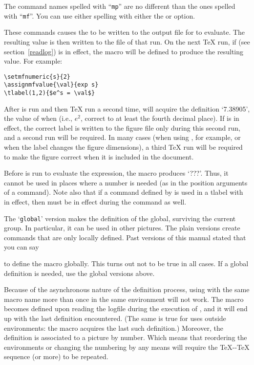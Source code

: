 \documentclass[letterpaper]{article}
\begin{document}
The command names spelled with ``\texttt{mp}'' are no different than the
ones spelled with ``\texttt{mf}''. You can use either spelling with
either the  or  option.

These commands causes the  to be written to the output
file for \MF{} to evaluate. The resulting value is then written to the
 file of that \MF{} run. On the next \TeX{} run, if
 (see section~\ref{readlog}) is in effect, the macro
 will be defined to produce the resulting value. For
example:
\begin{verbatim}
\setmfnumeric{s}{2}
\assignmfvalue{\val}{exp s}
\tlabel(1,2){$e^s = \val$}
\end{verbatim}
After \MF{} is run and then \TeX{} run a second time,  will
acquire the definition `7.38905', the value of  when
 (i.e., $e^2$, correct to at least the fourth decimal place).
If  is in effect, the correct label is written to the
figure file only during this second run, and a second \MP{} run will be
required. In many cases (when using \pdfTeX{}, for example, or when the
label changes the figure dimensions), a third \TeX{} run will be
required to make the figure correct when it is included in the document.

Before \MF{} is run to evaluate the expression, the macro produces
`???'. Thus, it cannot be used in places where a number is needed (as in
the position arguments of a  command). Note also that if a
command defined by  is used in a tlabel with
 in effect, then  must be in effect during
the  command as well.

The `\texttt{global}' version makes the definition of the
 global, surviving the current group. In particular,
it can be used in other pictures. The plain versions create commands
that are only locally defined. Past versions of this manual stated that
you can say
\begin{display}
\end{display}
to define the macro globally. This turns out not to be true in all
cases. If a global definition is needed, use the global versions above.

Because of the asynchronous nature of the definition process, using
 with the same macro name more than once in the same
 environment will not work. The macro becomes defined
upon reading the logfile during the execution of ,
and it will end up with the last definition encountered. (The same is
true for uses outside  environments: the macro acquires the
last such definition.)  Moreover, the definition is associated to a
picture by number. Which means that reordering the environments or
changing the numbering by any means will require the \TeX{}-\MF{}-\TeX{}
sequence (or more) to be repeated.
\end{document}
